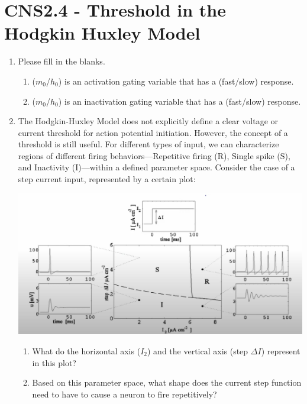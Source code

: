 \documentclass[11pt,letterpaper]{article}
\begin{document}
\section{CNS2.4 - Threshold in the Hodgkin Huxley Model}
\begin{enumerate}
    \item Please fill in the blanks.
    \begin{enumerate}
        \item ($m_0$/$h_0$) is an activation gating variable that has a (fast/slow) response.
        \item ($m_0$/$h_0$) is an inactivation gating variable that has a (fast/slow) response.
    \end{enumerate}

    \item The Hodgkin-Huxley Model does not explicitly define a clear voltage or current threshold for action potential initiation. However, the concept of a threshold is still useful. For different types of input, we can characterize regions of different firing behaviors—Repetitive firing (R), Single spike (S), and Inactivity (I)—within a defined parameter space. Consider the case of a step current input, represented by a certain plot:
    \begin{center}
        \includegraphics[scale=0.3]{2.4.png}
    \end{center}
    \begin{enumerate}
        \item What do the horizontal axis ($I_2$) and the vertical axis (step $\Delta I$) represent in this plot?
        \vspace{3 cm}
        \item Based on this parameter space, what shape does the current step function need to have to cause a neuron to fire repetitively?
    \end{enumerate}
\end{enumerate}
\pagebreak
\end{document}
